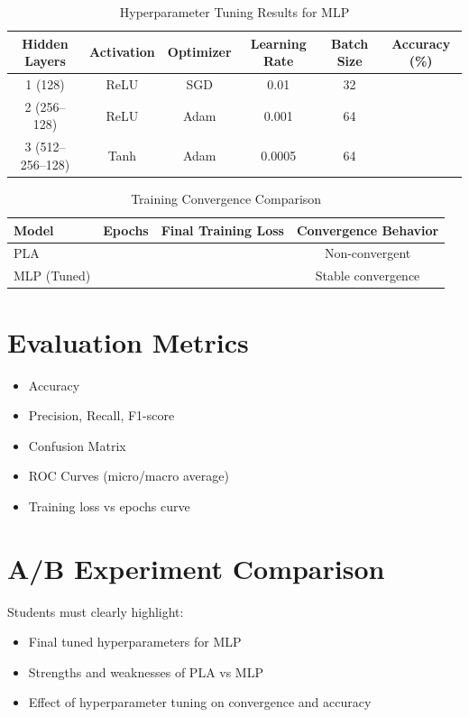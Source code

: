 \documentclass[11pt]{article}
\begin{document}
\begin{table}[h!]
\centering
\caption{Hyperparameter Tuning Results for MLP}
\renewcommand{\arraystretch}{1.3}
\begin{tabular}{cccccc}
\toprule
\textbf{Hidden Layers} & \textbf{Activation} & \textbf{Optimizer} & \textbf{Learning Rate} & \textbf{Batch Size} & \textbf{Accuracy (\%)} \\
\midrule
1 (128) & ReLU & SGD & 0.01 & 32 &  \\
2 (256--128) & ReLU & Adam & 0.001 & 64 &  \\
3 (512--256--128) & Tanh & Adam & 0.0005 & 64 &  \\
\bottomrule
\end{tabular}
\end{table}

\begin{table}[h!]
\centering
\caption{Training Convergence Comparison}
\renewcommand{\arraystretch}{1.3}
\begin{tabular}{lccc}
\toprule
\textbf{Model} & \textbf{Epochs} & \textbf{Final Training Loss} & \textbf{Convergence Behavior} \\
\midrule
PLA &  &  & Non-convergent \\
MLP (Tuned) &  &  & Stable convergence \\
\bottomrule
\end{tabular}
\end{table}

\section*{Evaluation Metrics}
\begin{itemize}
    \item Accuracy
    \item Precision, Recall, F1-score
    \item Confusion Matrix
    \item ROC Curves (micro/macro average)
    \item Training loss vs epochs curve
\end{itemize}

\section*{A/B Experiment Comparison}
Students must clearly highlight:
\begin{itemize}
    \item Final tuned hyperparameters for MLP
    \item Strengths and weaknesses of PLA vs MLP
    \item Effect of hyperparameter tuning on convergence and accuracy
\end{itemize}
\end{document}
